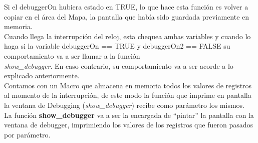 \documentclass[a4paper]{article}
\begin{document}
Si el debuggerOn hubiera estado en TRUE, lo que hace esta funci\'on es volver a copiar en el \'area del Mapa, la pantalla que hab\'ia sido guardada previamente en memoria.\\

Cuando llega la interrupci\'on del reloj, esta chequea ambas variables y cuando lo haga si la variable debuggerOn == TRUE y debuggerOn2 == FALSE su comportamiento va a ser llamar a la funci\'on \\ \textit{show_debugger}. En caso contrario, su comportamiento va a ser acorde a lo explicado anteriormente.\\


Contamos con un Macro que almacena en memoria todos los valores de registros al momento de la interrupci\'on, de este modo la funci\'on que imprime en pantalla la ventana de Debugging (\textit{show_debugger}) recibe como par\'ametro los mismos.\\

La funci\'on \textbf{show_debugger} va a ser la encargada de ``pintar'' la pantalla con la ventana de debugger, imprimiendo los valores de los registros que fueron pasados por par\'ametro.
\end{document}
